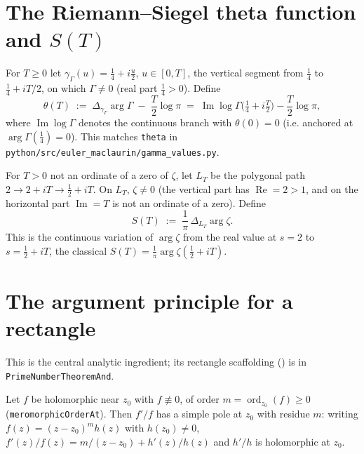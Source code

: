 \section{The Riemann--Siegel theta function and \texorpdfstring{$S(T)$}{S(T)}}
\label{sec:nf_theta_S}

\begin{definition}
\label{def:nf_theta}
\leanok
{}
For $T\ge0$ let $\gamma_\Gamma(u) = \tfrac14 + i\tfrac{u}{2}$, $u\in[0,T]$, the
vertical segment from $\tfrac14$ to $\tfrac14+iT/2$, on which $\Gamma\neq0$ (real
part $\tfrac14>0$). Define
\[
  \theta(T) \;:=\; \Delta_{\gamma_\Gamma}\arg\Gamma \;-\; \frac{T}{2}\log\pi
  \;=\; \operatorname{Im}\log\Gamma\!\bigl(\tfrac14 + i\tfrac{T}{2}\bigr)
        - \frac{T}{2}\log\pi ,
\]
where $\operatorname{Im}\log\Gamma$ denotes the continuous branch with
$\theta(0)=0$ (i.e. anchored at $\arg\Gamma(\tfrac14)=0$). This matches
\texttt{theta} in \texttt{python/src/euler\_maclaurin/gamma\_values.py}.
\end{definition}

\begin{definition}
\label{def:nf_S}
\leanok
{}
For $T>0$ not an ordinate of a zero of $\zeta$, let $L_T$ be the polygonal path
$2 \to 2+iT \to \tfrac12+iT$. On $L_T$, $\zeta\neq0$ (the vertical part has
$\operatorname{Re}=2>1$, and on the horizontal part $\operatorname{Im}=T$ is not an
ordinate of a zero). Define
\[
  S(T) \;:=\; \frac{1}{\pi}\,\Delta_{L_T}\arg\zeta .
\]
This is the continuous variation of $\arg\zeta$ from the real value at $s=2$ to
$s=\tfrac12+iT$, the classical $S(T) = \tfrac1\pi\arg\zeta(\tfrac12+iT)$.
\end{definition}

\section{The argument principle for a rectangle}
\label{sec:nf_argument_principle}

This is the central analytic ingredient; its rectangle scaffolding
() is in \texttt{PrimeNumberTheoremAnd}.

\begin{lemma}
\label{lem:nf_logderiv_residue}
\leanok
Let $f$ be holomorphic near $z_0$ with $f\not\equiv0$, of order
$m=\operatorname{ord}_{z_0}(f)\ge0$ (\texttt{meromorphicOrderAt}). Then $f'/f$ has a
simple pole at $z_0$ with residue $m$: writing $f(z)=(z-z_0)^m h(z)$ with
$h(z_0)\neq0$, $f'(z)/f(z) = m/(z-z_0) + h'(z)/h(z)$ and $h'/h$ is holomorphic at
$z_0$.
\end{lemma}


